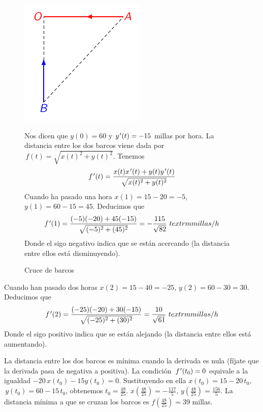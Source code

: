 \begin{ejercicios resueltos}
\begin{figure}[ht]
\centering{}%
\begin{minipage}[c]{0.4\textwidth}%
\begin{center}
\includegraphics{23_home_antalcides_Calculo_pdf_resuelto2.pdf}
\par\end{center}
\captionsetup{,singlelinecheck=off,margin=1cm} \caption{Cruce de barcos}
%
\end{minipage}%
\begin{minipage}[c]{0.55\textwidth}%
 \vspace{-4pt}
 Nos dicen que $y(0)=60$ y $y\mbox{$^{\mspace{2mu}\prime}$}(t)=-15$ millas por hora. La distancia
entre los dos barcos viene dada por $\,f(t)=\sqrt{x(t)^{2}+y(t)^{2}}$.
Tenemos 
\[
f\mbox{$^{\mspace{2mu}\prime}$}(t)=\frac{x(t)x\mbox{$^{\mspace{2mu}\prime}$}(t)+y(t)y\mbox{$^{\mspace{2mu}\prime}$}(t)}{\sqrt{x(t)^{2}+y(t)^{2}}}
\]
Cuando ha pasado una hora $x(1)=15-20=-5$, $y(1)=60-15=45$. Deducimos
que 
\[
f\tl(1)=\frac{(-5)(-20)+45(-15)}{\sqrt{(-5)^{2}+(45)^{2}}}=-\frac{115}{\sqrt{82}}\ textrm{millas/h}
\]
Donde el sigo negativo indica que se están acercando (la distancia
entre ellos está disminuyendo). %
\end{minipage}
\end{figure}

\vspace*{10mm}

Cuando han pasado dos horas $x(2)=15-40=-25$, $y(2)=60-30=30$. Deducimos
que 
\[
f\tl(2)=\frac{(-25)(-20)+30(-15)}{\sqrt{(-25)^{2}+(30)^{2}}}=\frac{10}{\sqrt{61}}\ textrm{millas/h}
\]
Donde el sigo positivo indica que se están alejando (la distancia
entre ellos está aumentando).

La distancia entre los dos barcos es mínima cuando la derivada es
nula (fíjate que la derivada pasa de negativa a positiva). La condición
$\,f\mbox{$^{\mspace{2mu}\prime}$}(t_{0})=0$ equivale a la igualdad $-20\,x(t_{0})-15y(t_{0})=0$.
Sustituyendo en ella $x(t_{0})=15-20\,t_{0}$, $\,y(t_{0})=60-15\,t_{0}$,
obtenemos $t_{0}=\frac{48}{25}$. $x(\frac{48}{25})=-\frac{117}{5}$,
$y(\frac{48}{25})=\frac{156}{5}$. La distancia mínima a que se cruzan
los barcos es $f(\frac{48}{25})=39$ millas.\hecho


\end{ejercicios resueltos}
